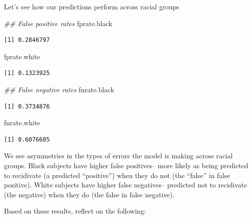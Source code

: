 \documentclass[
  letterpaper,
  DIV=11,
  numbers=noendperiod]{scrreprt}
\newenvironment{Shaded}{\begin{snugshade}}{\end{snugshade}}
\newcommand{\DocumentationTok}[1]{\textcolor[rgb]{0.37,0.37,0.37}{\textit{#1}}}
\newcommand{\NormalTok}[1]{\textcolor[rgb]{0.00,0.23,0.31}{#1}}
\begin{document}
Let's see how our predictions perform across racial groups

\begin{Shaded}
\begin{Highlighting}[]
\DocumentationTok{\#\# False positive rates}
\NormalTok{fprate.black}
\end{Highlighting}
\end{Shaded}

\begin{verbatim}
[1] 0.2846797
\end{verbatim}

\begin{Shaded}
\begin{Highlighting}[]
\NormalTok{fprate.white }
\end{Highlighting}
\end{Shaded}

\begin{verbatim}
[1] 0.1323925
\end{verbatim}

\begin{Shaded}
\begin{Highlighting}[]
\DocumentationTok{\#\# False negative rates}
\NormalTok{fnrate.black}
\end{Highlighting}
\end{Shaded}

\begin{verbatim}
[1] 0.3734876
\end{verbatim}

\begin{Shaded}
\begin{Highlighting}[]
\NormalTok{fnrate.white }
\end{Highlighting}
\end{Shaded}

\begin{verbatim}
[1] 0.6076605
\end{verbatim}

We see asymmetries in the types of errors the model is making across
racial groups. Black subjects have higher false positives-- more likely
as being predicted to recidivate (a predicted ``positive'') when they do
not (the ``false'' in false positive). White subjects have higher false
negatives-- predicted not to recidivate (the negative) when they do (the
false in false negative).

Based on these results, reflect on the following:
\end{document}
